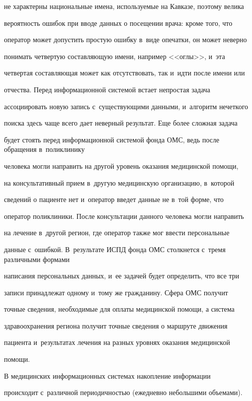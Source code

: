 не характерны национальные имена, используемые на Кавказе, поэтому велика 


вероятность ошибок при вводе данных о посещении врача: кроме того, что 


оператор может допустить простую ошибку в~виде опечатки, он может неверно 


понимать четвертую составляющую имени, например <<оглы>>, и~эта 


четвертая составляющая может как отсутствовать, так и~идти после имени или 


отчества. Перед информационной системой встает непростая задача 


ассоциировать новую запись с~существующими данными, и~алгоритм нечеткого 


поиска здесь чаще всего дает неверный результат. Еще более сложная задача 


будет стоять перед информационной системой фонда ОМС, ведь после обращения в~поликлинику 


человека могли направить на другой уровень оказания медицинской помощи, 


на консультативный прием в~другую медицинскую организацию, в~которой 


сведений о пациенте нет и~оператор введет данные не в~той форме, что 


оператор поликлиники. После консультации данного человека могли направить 


на лечение в~другой регион, где оператор также мог ввести персональные 


данные с~ошибкой. В~результате ИСПД фонда ОМС столкнется с~тремя различными формами 


написания персональных данных, и~ее задачей будет определить, что все три 


записи принадлежат одному и~тому же гражданину. Сфера ОМС получит 


точные сведения, необходимые для оплаты медицинской помощи, а система 


здравоохранения региона получит точные сведения о маршруте движения 


пациента и~результатах лечения на разных уровнях оказания медицинской 


помощи.


  


  В медицинских информационных системах накопление информации 


происходит с~различной периодичностью (ежедневно небольшими объемами). 


